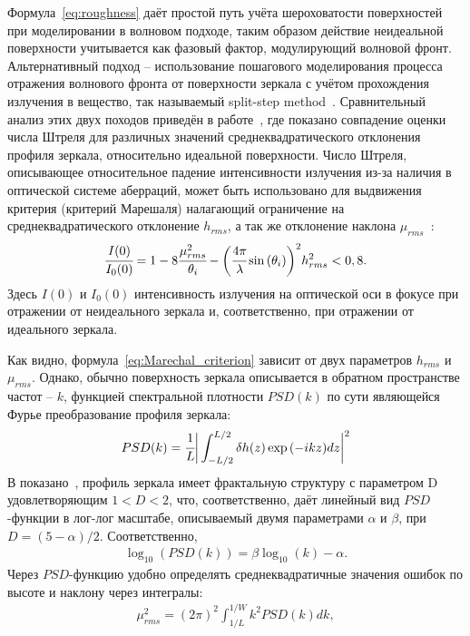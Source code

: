 Формула~\ref{eq:roughness} даёт простой путь учёта шероховатости поверхностей при моделировании в волновом подходе, таким образом действие неидеальной поверхности учитывается как фазовый фактор, модулирующий волновой фронт. Альтернативный подход -- использование пошагового моделирования процесса отражения волнового фронта от поверхности зеркала с учётом прохождения излучения в вещество, так называемый split-step method~\cite{serkez_design_2015}. Сравнительный анализ этих двух походов приведён в работе~\cite{serkez_design_2015}, где показано совпадение оценки числа Штреля для различных значений среднеквадратического отклонения профиля зеркала, относительно идеальной поверхности. Число Штреля, описывающее относительное падение интенсивности излучения из-за наличия в оптической системе аберраций, может быть использовано для выдвижения критерия (критерий Марешаля) налагающий ограничение на среднеквадратического отклонение $h_{rms}$, а так же отклонение наклона $\mu_{rms}$~\cite{church_specification_1993}:
\begin{align}
	\cfrac{I(0)}{I_0(0)} = 1 - 8\cfrac{\mu^2_{rms}}{\theta_i} - \bigg(\cfrac{4 \pi}{\lambda} \sin{(\theta_i)} \bigg)^2 h^2_{rms} < 0,8.
	\label{eq:Marechal_criterion}
\end{align}
Здесь $I(0)$ и $I_0(0)$ интенсивность излучения на оптической оси в фокусе при отражении от неидеального зеркала и, соответственно, при отражении от идеального зеркала. 

Как видно, формула~\ref{eq:Marechal_criterion} зависит от двух параметров $h_{rms}$ и $\mu_{rms}$. Однако, обычно поверхность зеркала описывается в обратном пространстве частот -- $k$, функцией спектральной плотности $PSD(k)$ по сути являющейся Фурье преобразование профиля зеркала: 
\begin{align}
	PSD(k) =  \cfrac{1}{L} \bigg| \int_{-L/2}^{L/2} \delta h(z) \exp{(-ikz)dz}  \bigg|^2
	\label{eq:PSD_def}
\end{align}
В показано~\cite{angeisky_fractal_nodate}, профиль зеркала имеет фрактальную структуру с параметром D удовлетворяющим $1 < D < 2$, что, соответственно, даёт линейный вид $PSD$-функции в лог-лог масштабе, описываемый двумя параметрами $\alpha$ и $\beta$, при $D = (5 - \alpha)/2$. Соответственно, 
\begin{align}
	\log_{10}(PSD(k)) =  \beta \log_{10}(k) - \alpha.
\end{align}
Через $PSD$-функцию удобно определять среднеквадратичные значения ошибок по высоте и наклону через интегралы:
\begin{align}
	\mu^2_{rms} =  (2 \pi)^2 \int^{1/W}_{1/L} k^2 PSD(k) dk,
\end{align}

